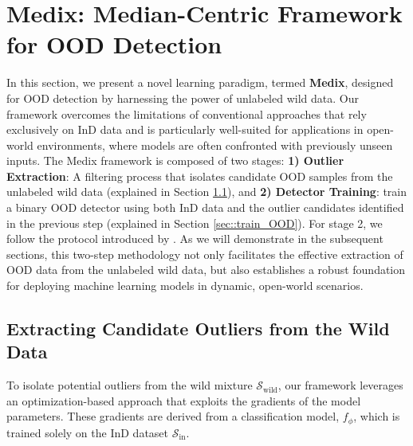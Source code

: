 \documentclass[10pt]{article} %
\theoremstyle{plain}
\theoremstyle{definition}
\begin{document}
\section{Medix: Median-Centric Framework for OOD Detection}
In this section, we present a novel learning paradigm, termed \textbf{Medix}, designed for OOD detection by harnessing the power of unlabeled wild data. Our framework overcomes the limitations of conventional approaches that rely exclusively on InD data and is particularly well-suited for applications in open-world environments, where models are often confronted with previously unseen inputs. The Medix framework is composed of two stages:
\textbf{1) Outlier Extraction}: A filtering process that isolates candidate OOD samples from the unlabeled wild data (explained in Section \ref{sec::filtering}), and
\textbf{2) Detector Training}: train a binary OOD detector using both InD data and the outlier candidates identified in the previous step (explained in Section \ref{sec::train_OOD}). For stage 2, we follow the protocol introduced by \citet{du2024how}. As we will demonstrate in
the subsequent sections, this two-step methodology not only facilitates the effective extraction of OOD data
from the unlabeled wild data, but also establishes a robust foundation for deploying machine learning models
in dynamic, open-world scenarios.


\subsection{Extracting Candidate Outliers from the Wild Data} \label{sec::filtering}
To isolate potential outliers from the wild mixture \( \mathcal{S}_{\text{wild}} \), our framework leverages an optimization-based approach that exploits the gradients of the model parameters. These gradients are derived from a classification model, \( f_{\phi} \), which is trained solely on the InD dataset \( \mathcal{S}_{\text{in}} \). 
\end{document}
